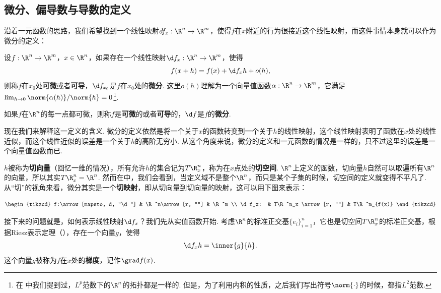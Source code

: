 \subsection{微分、偏导数与导数的定义}\label{subsec:partial-derivative}

沿着一元函数的思路，我们希望找到一个线性映射$df_x:\R^n\to\R^m$，使得$f$在$x$附近的行为很接近这个线性映射，而这件事情本身就可以作为微分的定义：

\begin{definition}[微分]
    设$f:\R^n\to\R^m$，$x\in\R^n$，如果存在一个线性映射$\d f_{x}:\R^n\to\R^m$，使得
    \[
        f(x+h)=f(x)+\d f_{x}h+o(h),
    \]
    则称$f$在$x_0$处\textbf{可微}或者\textbf{可导}，$\d f_{x_0}$是$f$在$x_0$处的\textbf{微分}. 这里$o(h)$理解为一个向量值函数$\alpha:\R^n\to\R^m$，它满足$\lim_{h\to 0}\norm{\alpha(h)}/\norm{h}=0$\footnote{在 中我们提到过，$L^p$范数下的$\R^n$的拓扑都是一样的. 但是，为了利用内积的性质，之后我们写出符号$\norm{\cdot}$的时候，都指$L^2$范数.}.

    如果$f$在$\R^n$的每一点都可微，则称$f$是\textbf{可微}的或者\textbf{可导}的，$\d f$是$f$的\textbf{微分}.
\end{definition}

现在我们来解释这一定义的含义. 微分的定义依然是将一个关于$x$的函数转变到一个关于$h$的线性映射，这个线性映射表明了函数在$x$处的线性近似，而这个线性近似的误差是一个关于$h$的高阶无穷小. 从这个角度来说，微分的定义和一元函数的情况是一样的，只不过这里的误差是一个向量值函数而已. 

$h$被称为\textbf{切向量}（回忆一维的情况），所有允许$h$的集合记为$T\R_x^n$，称为在$x$点处的\textbf{切空间}. $\R^n$上定义的函数，切向量$h$自然可以取遍所有$\R^n$的向量，所以其实$T\R_x^n=\R^n$. 然而在中，我们会看到，当定义域不是整个$\R^n$，而只是某个子集的时候，切空间的定义就变得不平凡了. 从“切”的视角来看，微分其实是一个\textbf{切映射}，即从切向量到切向量的映射，这可以用下图来表示：

\[\begin{tikzcd} f:\arrow[mapsto, d, "\d"] & \R^n\arrow[r, ""] & \R^m \\
\d f_x: & T\R^n_x \arrow[r, ""] & T\R^m_{f(x)}
\end{tikzcd}\]

接下来的问题就是，如何表示线性映射$\d f_x$？我们先从实值函数开始. 考虑$\R^n$的标准正交基$\{e_i\}_{i=1}^n$，它也是切空间$T\R^n_x$的标准正交基，根据Riesz表示定理（），存在一个向量$g$，使得
\[
    \d f_x h=\inner{g}{h}.
\]
这个向量$g$被称为$f$在$x$处的\textbf{梯度}，记作$\grad f(x)$. 

